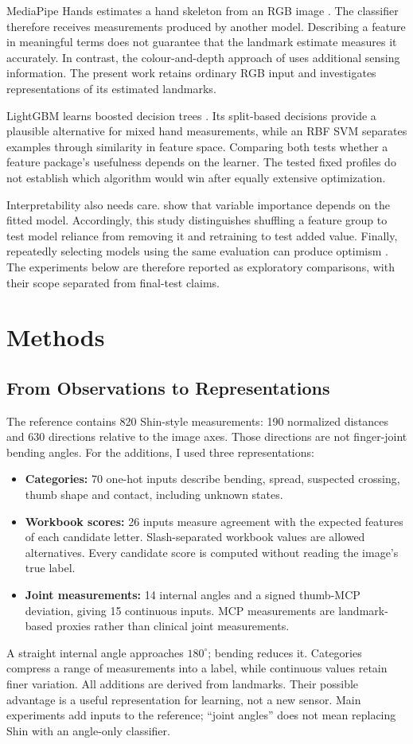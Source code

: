 \documentclass{article}
\begin{document}
MediaPipe Hands estimates a hand skeleton from an RGB image \citep{zhang2020}. The classifier therefore receives measurements produced by another model. Describing a feature in meaningful terms does not guarantee that the landmark estimate measures it accurately. In contrast, the colour-and-depth approach of \citet{pugeault2011} uses additional sensing information. The present work retains ordinary RGB input and investigates representations of its estimated landmarks.

LightGBM learns boosted decision trees \citep{ke2017}. Its split-based decisions provide a plausible alternative for mixed hand measurements, while an RBF SVM separates examples through similarity in feature space. Comparing both tests whether a feature package's usefulness depends on the learner. The tested fixed profiles do not establish which algorithm would win after equally extensive optimization.

Interpretability also needs care. \citet{fisher2019} show that variable importance depends on the fitted model. Accordingly, this study distinguishes shuffling a feature group to test model reliance from removing it and retraining to test added value. Finally, repeatedly selecting models using the same evaluation can produce optimism \citep{cawley2010}. The experiments below are therefore reported as exploratory comparisons, with their scope separated from final-test claims.

\section{Methods}
\subsection{From Observations to Representations}
The reference contains 820 Shin-style measurements: 190 normalized distances and 630 directions relative to the image axes. Those directions are not finger-joint bending angles. For the additions, I used three representations:
\begin{itemize}
\item \textbf{Categories:} 70 one-hot inputs describe bending, spread, suspected crossing, thumb shape and contact, including unknown states.
\item \textbf{Workbook scores:} 26 inputs measure agreement with the expected features of each candidate letter. Slash-separated workbook values are allowed alternatives. Every candidate score is computed without reading the image's true label.
\item \textbf{Joint measurements:} 14 internal angles and a signed thumb-MCP deviation, giving 15 continuous inputs. MCP measurements are landmark-based proxies rather than clinical joint measurements.
\end{itemize}
A straight internal angle approaches $180^\circ$; bending reduces it. Categories compress a range of measurements into a label, while continuous values retain finer variation. All additions are derived from landmarks. Their possible advantage is a useful representation for learning, not a new sensor. Main experiments add inputs to the reference; ``joint angles'' does not mean replacing Shin with an angle-only classifier.
\end{document}
